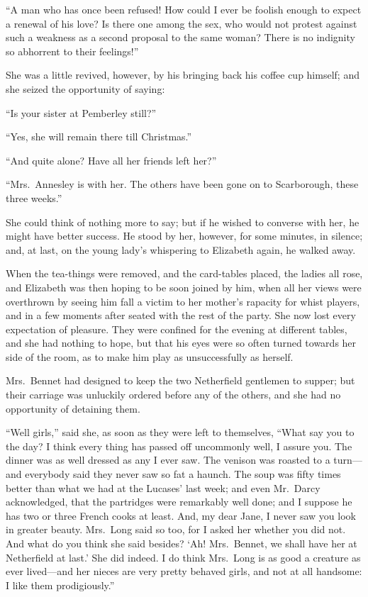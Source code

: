 \documentclass[12pt,english]{book}
\begin{document}
{}``A man who has once been refused! How could I ever be foolish
enough to expect a renewal of his love? Is there one among the sex,
who would not protest against such a weakness as a second proposal
to the same woman? There is no indignity so abhorrent to their feelings!''\ 

She was a little revived, however, by his bringing back his coffee
cup himself; and she seized the opportunity of saying:

{}``Is your sister at Pemberley still?''\ 

{}``Yes, she will remain there till Christmas.''

{}``And quite alone? Have all her friends left her?''\ 

{}``Mrs.\ Annesley is with her. The others have been gone on to
Scarborough, these three weeks.''

She could think of nothing more to say; but if he wished to converse
with her, he might have better success. He stood by her, however,
for some minutes, in silence; and, at last, on the young lady's whispering
to Elizabeth again, he walked away.

When the tea-things were removed, and the card-tables placed, the
ladies all rose, and Elizabeth was then hoping to be soon joined by
him, when all her views were overthrown by seeing him fall a victim
to her mother's rapacity for whist players, and in a few moments after
seated with the rest of the party. She now lost every expectation
of pleasure. They were confined for the evening at different tables,
and she had nothing to hope, but that his eyes were so often turned
towards her side of the room, as to make him play as unsuccessfully
as herself.

Mrs.\ Bennet had designed to keep the two Netherfield gentlemen to
supper; but their carriage was unluckily ordered before any of the
others, and she had no opportunity of detaining them.

{}``Well girls,'' said she, as soon as they were left to themselves,
{}``What say you to the day? I think every thing has passed off uncommonly
well, I assure you. The dinner was as well dressed as any I ever saw.
The venison was roasted to a turn\mbox{---}and everybody said they
never saw so fat a haunch. The soup was fifty times better than what
we had at the Lucases' last week; and even Mr.\ Darcy acknowledged,
that the partridges were remarkably well done; and I suppose he has
two or three French cooks at least. And, my dear Jane, I never saw
you look in greater beauty. Mrs.\ Long said so too, for I asked her
whether you did not. And what do you think she said besides? `Ah!
Mrs.\ Bennet, we shall have her at Netherfield at last.' She did
indeed. I do think Mrs.\ Long is as good a creature as ever lived\mbox{---}and
her nieces are very pretty behaved girls, and not at all handsome:
I like them prodigiously.''
\end{document}
